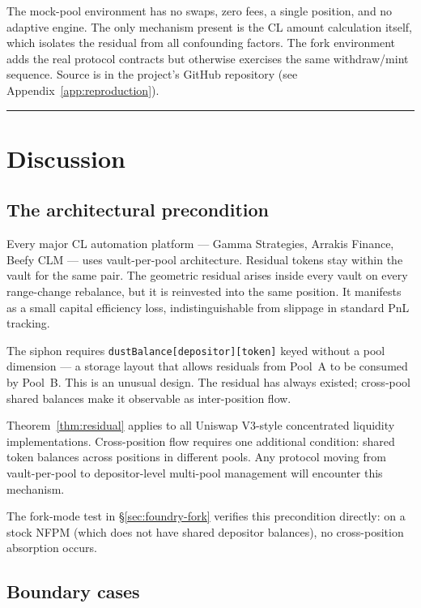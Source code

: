 \documentclass[11pt,a4paper]{article}
\begin{document}
The mock-pool environment has no swaps, zero fees, a single position, and no adaptive engine. The only mechanism present is the CL amount calculation itself, which isolates the residual from all confounding factors. The fork environment adds the real protocol contracts but otherwise exercises the same withdraw/mint sequence. Source is in the project's GitHub repository (see Appendix~\ref{app:reproduction}).

\begin{center}\rule{0.5\linewidth}{0.5pt}\end{center}

\section{Discussion}\label{sec:discussion}

\subsection{The architectural precondition}\label{sec:precondition}

Every major CL automation platform --- Gamma Strategies, Arrakis Finance, Beefy CLM --- uses vault-per-pool architecture. Residual tokens stay within the vault for the same pair. The geometric residual arises inside every vault on every range-change rebalance, but it is reinvested into the same position. It manifests as a small capital efficiency loss, indistinguishable from slippage in standard PnL tracking.

The siphon requires \texttt{dustBalance[depositor][token]} keyed without a pool dimension --- a storage layout that allows residuals from Pool~A to be consumed by Pool~B. This is an unusual design. The residual has always existed; cross-pool shared balances make it observable as inter-position flow.

Theorem~\ref{thm:residual} applies to all Uniswap V3-style concentrated liquidity imple\-mentations. Cross-position flow requires one additional condition: shared token balances across positions in different pools. Any protocol moving from vault-per-pool to depositor-level multi-pool management will encounter this mechanism.

The fork-mode test in \S\ref{sec:foundry-fork} verifies this precondition directly: on a stock NFPM (which does not have shared depositor balances), no cross-position absorption occurs.

\subsection{Boundary cases}\label{sec:boundary}
\end{document}
